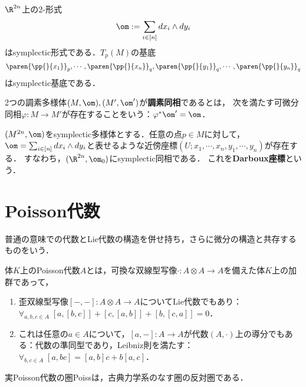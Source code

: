 \documentclass[uplatex,dvipdfmx]{jsreport}
\begin{document}
\begin{example}[標準symplectic多様体]
    $\R^{2n}$上の2-形式
    \[\om:=\sum_{i\in[n]}dx_i\wedge dy_i\]
    はsymplectic形式である．$T_p(M)$の基底
    \[\paren{\pp{}{x_1}}_p,\cdots,\paren{\pp{}{x_n}}_q,\paren{\pp{}{y_1}}_q,\cdots,\paren{\pp{}{y_n}}_q\]
    はsymplectic基底である．
\end{example}

\begin{definition}
    2つの調素多様体$(M,\om),(M',\om')$が\textbf{調素同相}であるとは，
    次を満たす可微分同相$\varphi:M\to M'$が存在することをいう：$\varphi^*\om'=\om$．
\end{definition}

\begin{theorem}[Darboux]
    $(M^{2n},\om)$をsymplectic多様体とする．任意の点$p\in M$に対して，$\om=\sum_{i\in[n]}dx_i\wedge dy_i$と表せるような近傍座標$(U;x_1,\cdots,x_n,y_1,\cdots,y_n)$が存在する．
    すなわち，$(\R^{2n},\om_0)$にsymplectic同相である．
    これを\textbf{Darboux座標}という．
\end{theorem}

\section{Poisson代数}

\begin{tcolorbox}[colframe=ForestGreen, colback=ForestGreen!10!white,breakable,colbacktitle=ForestGreen!40!white,coltitle=black,fonttitle=\bfseries\sffamily,
title=]
    普通の意味での代数とLie代数の構造を併せ持ち，さらに微分の構造と共存するものをいう．

\end{tcolorbox}

\begin{definition}
    体$K$上のPoisson代数$A$とは，可換な双線型写像$\cdot:A\otimes A\to A$を備えた体$K$上の加群であって，
    \begin{enumerate}
        \item 歪双線型写像$[-,-]:A\otimes A\to A$についてLie代数でもあり：$\forall_{a,b,c\in A}\;[a,[b,c]]+[c,[a,b]]+[b,[c,a]]=0$．
        \item これは任意の$a\in A$について，$[a,-]:A\to A$が代数$(A,\cdot)$上の導分でもある：代数の準同型であり，Leibniz則を満たす：$\forall_{b,c\in A}\;[a,bc]=[a,b]c+b[a,c]$．
    \end{enumerate}
    実Poisson代数の圏Poissは，古典力学系のなす圏の反対圏である．
\end{definition}
\end{document}
